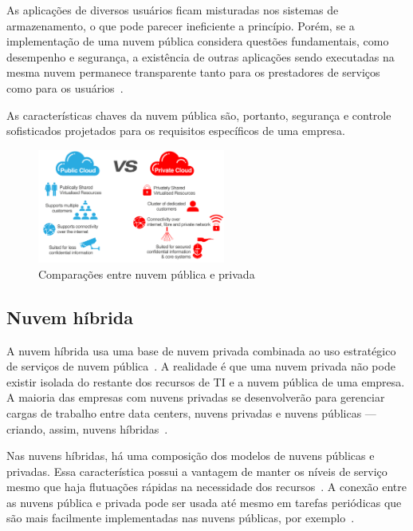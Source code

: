 As aplicações de diversos usuários ficam misturadas nos sistemas de armazenamento,
o que pode parecer ineficiente a princípio. Porém, se a implementação de uma nuvem
pública considera questões fundamentais, como desempenho e segurança, a existência
de outras aplicações sendo executadas na mesma nuvem permanece transparente tanto
para os prestadores de serviços como para os usuários~\cite{technet-cloud-computing}.

As características chaves da nuvem pública são, portanto, segurança e controle
sofisticados projetados para os requisitos específicos de uma empresa.

\begin{figure}[ht]
    \centering
    \includegraphics[width=0.55\textwidth]{img/privatePublic.png}
    \caption{Comparações entre nuvem pública e privada}
\end{figure}

\subsection{Nuvem híbrida}

A nuvem híbrida usa uma base de nuvem privada combinada ao uso estratégico de 
serviços de nuvem pública~\cite{ibm-what-is-cloud-computing}. A realidade é que uma 
nuvem privada não pode existir isolada do restante dos recursos de TI e a nuvem 
pública de uma empresa. A maioria das empresas com nuvens privadas se desenvolverão 
para gerenciar cargas de trabalho entre data centers, nuvens privadas e nuvens 
públicas --- criando, assim, nuvens híbridas~\cite{ibm-what-is-cloud-computing}.

Nas nuvens híbridas, há uma composição dos modelos de nuvens públicas e privadas.
Essa característica possui a vantagem de manter os níveis de serviço mesmo que
haja flutuações rápidas na necessidade dos recursos~\cite{technet-cloud-computing}.
A conexão entre as nuvens pública e privada pode ser usada até mesmo em tarefas
periódicas que são mais facilmente implementadas nas nuvens públicas, por
exemplo~\cite{technet-cloud-computing}.

